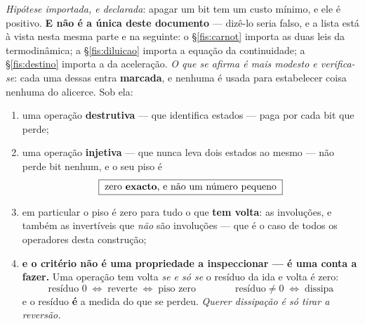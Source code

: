 \documentclass[livro.tex]{subfiles}
\begin{document}
\begin{teorema}\label{fis:thm:landauer}
\emph{Hipótese importada, e declarada}: apagar um bit tem um custo mínimo, e ele
é positivo. \textbf{E não é a única deste documento} --- dizê-lo seria falso, e a
lista está à vista nesta mesma parte e na seguinte: o §\ref{fis:carnot} importa
as duas leis da termodinâmica; a §\ref{fis:diluicao} importa a equação da
continuidade; a §\ref{fis:destino} importa a da aceleração. \emph{O que se
afirma é mais modesto e verifica-se}: cada uma dessas entra \textbf{marcada}, e
nenhuma é usada para estabelecer coisa nenhuma do alicerce. Sob ela:
\begin{enumerate}\itemsep3pt
\item[(1)] uma operação \textbf{destrutiva} --- que identifica estados --- paga
por cada bit que perde;
\item[(2)] uma operação \textbf{injetiva} --- que nunca leva dois estados ao
mesmo --- não perde bit nenhum, e o seu piso é
\[
\boxed{\;\text{zero \textbf{exacto}, e não um número pequeno}\;}
\]
\item[(3)] em particular o piso é zero para tudo o que \textbf{tem volta}: as
involuções, e também as invertíveis que \emph{não} são involuções --- que é o
caso de todos os operadores desta construção;
\item[(4)] \textbf{e o critério não é uma propriedade a inspeccionar --- é uma
conta a fazer.} Uma operação tem volta \emph{se e só se} o resíduo da ida e volta
é zero:
\[
\boxed{\;\text{resíduo }0\;\Longleftrightarrow\;\text{reverte}
\;\Longleftrightarrow\;\text{piso zero}
\qquad\qquad
\text{resíduo}\neq0\;\Longleftrightarrow\;\text{dissipa}\;}
\]
e o resíduo \textbf{é} a medida do que se perdeu. \emph{Querer dissipação é só
tirar a reversão.}
\end{enumerate}
\end{teorema}
\end{document}
